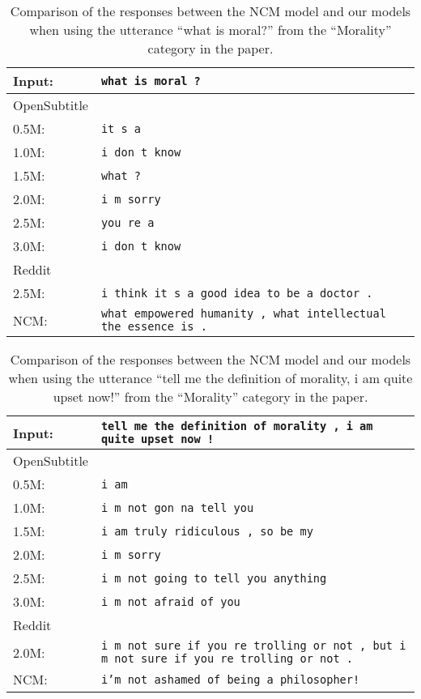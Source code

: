\begin{table}[H]
	\centering
	\begin{adjustbox}{max width=\textwidth}
		\begin{tabular}{ll}
			\toprule
			Input: 	& \texttt{what is moral ?}\\
			\midrule
			OpenSubtitle\\
			0.5M: 	& \texttt{it s a}\\
			1.0M: 	& \texttt{i don t know}\\
			1.5M:	& \texttt{what ?}\\
			2.0M:	& \texttt{i m sorry}\\
			2.5M:	& \texttt{you re a}\\
			3.0M:	& \texttt{i don t know}\\
			\midrule
			Reddit\\
			2.5M:	& \texttt{i think it s a good idea to be a doctor .}\\
			\midrule
			NCM:	& \texttt{what empowered humanity , what intellectual the essence is .}\\
			\bottomrule
		\end{tabular}
	\end{adjustbox}
	\caption{Comparison of the responses between the NCM model and our models when using the utterance ``what is moral?'' from the ``Morality'' category in the paper.}
	\label{results:example18_output:Neural_Conversational_Model_compared}
\end{table}

\begin{table}[H]
	\centering
	\begin{adjustbox}{max width=\textwidth}
		\begin{tabular}{ll}
			\toprule
			Input: 	& \texttt{tell me the definition of morality , i am quite upset now !}\\
			\midrule
			OpenSubtitle\\
			0.5M: 	& \texttt{i am}\\
			1.0M: 	& \texttt{i m not gon na tell you}\\
			1.5M:	& \texttt{i am truly ridiculous , so be my}\\
			2.0M:	& \texttt{i m sorry}\\
			2.5M:	& \texttt{i m not going to tell you anything}\\
			3.0M:	& \texttt{i m not afraid of you}\\
			\midrule
			Reddit\\
			2.0M:	& \texttt{i m not sure if you re trolling or not , but i m not sure if you re trolling or not .}\\
			\midrule
			NCM:	& \texttt{i'm not ashamed of being a philosopher!}\\
			\bottomrule
		\end{tabular}
	\end{adjustbox}
	\caption{Comparison of the responses between the NCM model and our models when using the utterance ``tell me the definition of morality, i am quite upset now!'' from the ``Morality'' category in the paper.}
	\label{results:example19_output:Neural_Conversational_Model_compared}
\end{table}
